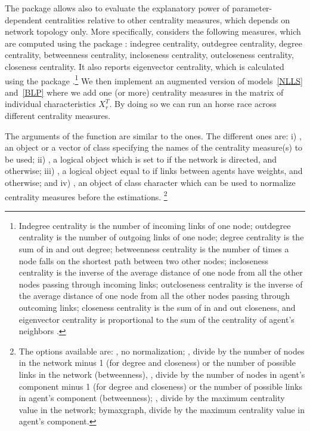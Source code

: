 \documentclass[nojss]{jss}
\begin{document}
The  package  allows also to evaluate the explanatory power of parameter-dependent centralities relative to other centrality measures, which depends on network topology only. More specifically,  considers the following measures, which are computed using the  package  \citep{igraph}: indegree centrality, outdegree centrality, degree centrality, betweenness centrality, incloseness centrality, outcloseness centrality, closeness centrality. It also reports eigenvector centrality, which is calculated using the  package  \citep{sna}.\footnote{Indegree centrality is the number of incoming links of one node; outdegree centrality is the number of outgoing links of one node; degree centrality is the sum of in and out degree; betweenness centrality is the number of times a node falls on the shortest path between two other nodes; incloseness centrality is the inverse of the average distance of one node from all the other nodes passing through incoming links; outcloseness centrality is the inverse of the average distance of one node from all the other nodes passing through outcoming links; closeness centrality is the sum of in and out closeness, and eigenvector centrality is proportional to the sum of the centrality of agent's neighbors \cite[see][for further details]{Jackson:2010}.}
We then implement an augmented version of models~\ref{NLLS} and~\ref{BLP} where we add one (or more) centrality measures in the matrix of individual characteristics $X_{r}^{T}.$ By doing so we can run an horse race across different centrality measures.

The arguments of the function  are similar to the  ones. The different ones are: i) , an object or a vector of class  specifying the names of the centrality measure(s) to be used; ii) , a logical object
which is set to  if the network is directed, and  otherwise; iii) , a logical object equal to  if links between agents have weights, and  otherwise; and iv) , an object
of class character which can be used to normalize centrality measures before the estimations. \footnote{The options available are: , no normalization; , divide by the number of nodes in the network minus 1 (for degree and closeness) or the number of possible links in the network (betweenness), , divide by the number of nodes in agent's component minus 1 (for degree and closeness) or the number of possible links in agent's component (betweenness); , divide by the maximum centrality value in the network; bymaxgraph, divide by the maximum centrality value in agent's component.}
\end{document}
